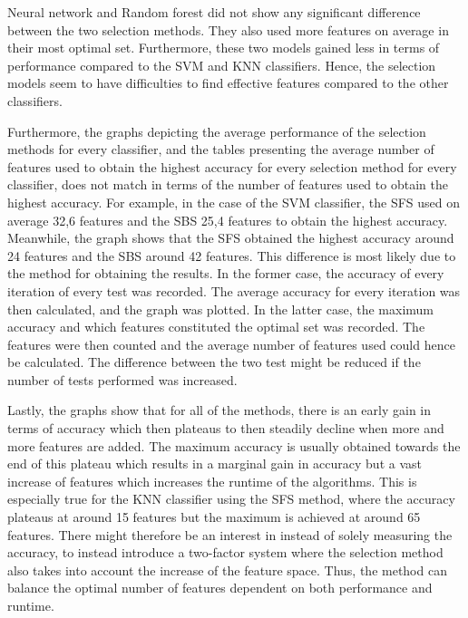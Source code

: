\documentclass{kththesis}
\begin{document}
Neural network and Random forest did not show any significant difference between the two selection methods. They also used more features on average in their most optimal set. Furthermore, these two models gained less in terms of performance compared to the SVM and KNN classifiers. Hence, the selection models seem to have difficulties to find effective features compared to the other classifiers.


Furthermore, the graphs depicting the average performance of the selection methods for every classifier, and the tables presenting the average number of features used to obtain the highest accuracy for every selection method for every classifier, does not match in terms of the number of features used to obtain the highest accuracy. %
For example, in the case of the SVM classifier, the SFS used on average 32,6 features and the SBS 25,4 features to obtain the highest accuracy. Meanwhile, the graph shows that the SFS obtained the highest accuracy around 24 features and the SBS around 42 features. This difference  is most likely due to the method for obtaining the results. In the former case, the accuracy of every iteration of every test was recorded. The average accuracy for every iteration was then calculated, and the graph was plotted. In the latter case, the maximum accuracy and which features constituted the optimal set was recorded. The features were then counted and the average number of features used could hence be calculated. The difference between the two test might be reduced if the number of tests performed was increased. 

Lastly, the graphs  show that for all of the methods, there is an early gain in terms of accuracy which then plateaus to then steadily decline when more and more features are added. The maximum accuracy is usually obtained towards the end of this plateau which results in a marginal gain in accuracy but a vast increase of features which increases the runtime of the algorithms. This is especially true for the KNN classifier using the SFS method, where the accuracy plateaus at around 15 features but the maximum is achieved at around 65 features. There might therefore be an interest in instead of solely measuring the accuracy, to instead introduce a two-factor system where the selection method also takes into account the increase of the feature space. Thus, the method can balance the optimal number of features dependent on both performance and runtime.
\end{document}
